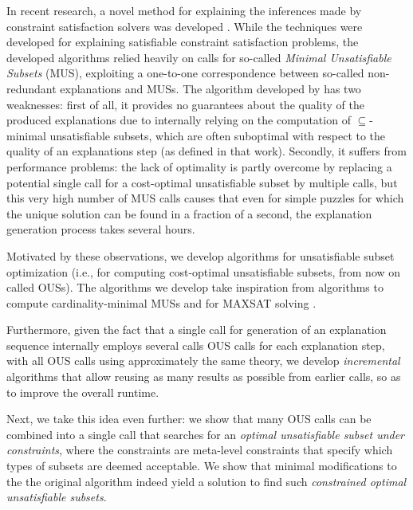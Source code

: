 


In recent research, a novel method for explaining the inferences made by constraint satisfaction solvers was developed \cite{ecai/BogaertsGCG20}. 
While the techniques were developed for explaining satisfiable constraint satisfaction problems, the developed algorithms relied heavily on calls for so-called \emph{Minimal Unsatisfiable Subsets} (MUS), exploiting a one-to-one correspondence between so-called non-redundant explanations and MUSs. 
The algorithm developed by \citet{ecai/BogaertsGCG20} has two weaknesses: first of all, it provides no guarantees about the quality of the produced explanations due to internally relying on the computation of $\subseteq$-minimal unsatisfiable subsets, which are often suboptimal with respect to the quality of an explanations step (as defined in that work). 
Secondly, it suffers from performance problems: the lack of optimality is partly overcome by replacing a potential single call for a cost-optimal unsatisfiable subset by multiple calls, but this very high number of MUS calls causes that even for simple puzzles for which the unique solution can be found in a fraction of a second, the explanation generation process takes several hours. 


Motivated by these observations, we develop algorithms for unsatisfiable subset optimization (i.e., for computing cost-optimal unsatisfiable subsets, from now on called OUSs). The algorithms we develop take inspiration from 
\hitsetbased algorithms to compute cardinality-minimal MUSs \cite{ignatiev2015smallest} and for MAXSAT solving \cite{davies}. 

Furthermore, given the fact that a single call for generation of an explanation sequence internally employs several calls OUS calls for each explanation step, with all OUS calls using approximately the same theory, we develop \emph{incremental} algorithms that allow reusing as many results as possible from earlier calls, so as to improve the overall runtime. 

Next, we take this idea even further: we show that many OUS calls can be combined into a single call that searches for an \emph{optimal unsatisfiable subset under constraints}, where the constraints are meta-level constraints that specify which types of subsets are deemed acceptable. 
We show that minimal modifications to the the original algorithm indeed yield a solution to find such \emph{constrained optimal unsatisfiable subsets}. 

